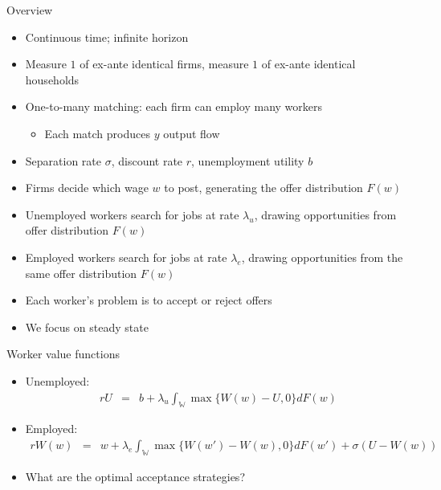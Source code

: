\documentclass[9pt]{beamer}
\newcommand{\bit}{\begin{itemize}}
\newcommand{\eit}{\end{itemize}}
\begin{document}
\begin{frame}{Overview}

\bit
\setlength\itemsep{1em}

\item Continuous time; infinite horizon

\item Measure $1$ of ex-ante identical firms, measure $1$ of ex-ante identical households

\item One-to-many matching: each firm can employ many workers
\bit
	\item Each match produces $y$ output flow
\eit

\item Separation rate $\sigma$, discount rate $r$, unemployment utility $b$

\item Firms decide which wage $w$ to post, generating the offer distribution $F(w)$

\item Unemployed workers search for jobs at rate $\lambda_u$, drawing opportunities from offer distribution $F(w)$

\item Employed workers search for jobs at rate $\lambda_e$, drawing opportunities from the same offer distribution $F(w)$

\item Each worker's problem is to accept or reject offers

\item We focus on steady state

\eit

\end{frame}

\begin{frame}{Worker value functions}

\bit
\setlength\itemsep{2em}

\item Unemployed:
\begin{eqnarray}
 rU  &=&  b + \lambda_u  \int_{\mathds{W}} \max\{W(w)-U, 0\} dF(w) \nonumber
\end{eqnarray}

\item Employed:
\begin{eqnarray}
rW(w)  &=&  w + \lambda_e  \int_{\mathds{W}} \max\{W(w')-W(w), 0\} dF(w') + \sigma(U-W(w)) \nonumber
\end{eqnarray}

\item What are the optimal acceptance strategies?

\eit

\end{frame}
\end{document}
